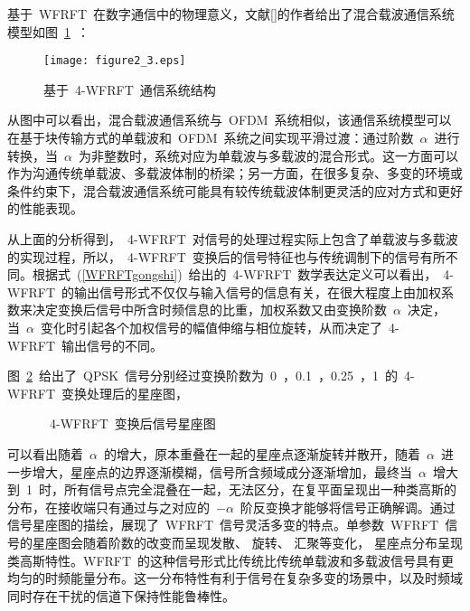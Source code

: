 基于~WFRFT~在数字通信中的物理意义，文献[]的作者给出了混合载波通信系统模型如图~\ref{xitongjiegou}~：
\begin{figure}[htbp]
\centering
\texttt{[image: figure2\_3.eps]}
\caption{基于~4-WFRFT~通信系统结构}\vspace{-1em}\label{xitongjiegou}
\end{figure}

从图中可以看出，混合载波通信系统与~OFDM~系统相似，该通信系统模型可以在基于块传输方式的单载波和~OFDM~系统之间实现平滑过渡：通过阶数~$\alpha$~进行转换，当~$\alpha$~为非整数时，系统对应为单载波与多载波的混合形式。这一方面可以作为沟通传统单载波、多载波体制的桥梁；另一方面，在很多复杂、多变的环境或条件约束下，混合载波通信系统可能具有较传统载波体制更灵活的应对方式和更好的性能表现。

从上面的分析得到，~4-WFRFT~对信号的处理过程实际上包含了单载波与多载波的实现过程，所以，~4-WFRFT~变换后的信号特征也与传统调制下的信号有所不同。根据式~(\ref{WFRFTgongshi})~给出的~4-WFRFT~数学表达定义可以看出，~4-WFRFT~的输出信号形式不仅仅与输入信号的信息有关，在很大程度上由加权系数来决定变换后信号中所含时频信息的比重，加权系数又由变换阶数~$\alpha$~决定，当~$\alpha$~变化时引起各个加权信号的幅值伸缩与相位旋转，从而决定了~4-WFRFT~输出信号的不同。

图~\ref{xingzuotu}~给出了~QPSK~信号分别经过变换阶数为~0~，0.1~，0.25~，1~的~4-WFRFT~变换处理后的星座图，
\begin{figure}[htbp]
\centering
\subfigure{\label{xingzuo1}}\addtocounter{subfigure}{-2}
\subfigure{\label{xingzuo2}}\addtocounter{subfigure}{-2}
\subfigure{\label{xingzuo3}}\addtocounter{subfigure}{-2}
\subfigure{\label{xingzuo4}}\addtocounter{subfigure}{-2}
\caption{~4-WFRFT~变换后信号星座图}\label{xingzuotu}\vspace{-1em}
\end{figure}
可以看出随着~$\alpha$~的增大，原本重叠在一起的星座点逐渐旋转并散开，随着~$\alpha$~进一步增大，星座点的边界逐渐模糊，信号所含频域成分逐渐增加，最终当~$\alpha$~增大到~1~时，所有信号点完全混叠在一起，无法区分，在复平面呈现出一种类高斯的分布，在接收端只有通过与之对应的~$-\alpha$~阶反变换才能够将信号正确解调。通过信号星座图的描绘，展现了~WFRFT~信号灵活多变的特点。单参数~WFRFT~信号的星座图会随着阶数的改变而呈现发散、 旋转、 汇聚等变化， 星座点分布呈现类高斯特性。WFRFT~的这种信号形式比传统比传统单载波和多载波信号具有更均匀的时频能量分布。这一分布特性有利于信号在复杂多变的场景中，以及时频域同时存在干扰的信道下保持性能鲁棒性。
